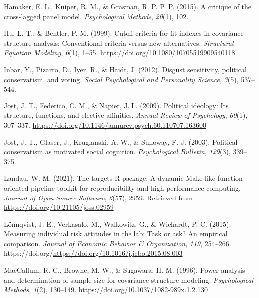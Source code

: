 \documentclass[
  man,floatsintext]{apa6}
\newlength{\cslhangindent}
\newlength{\cslentryspacingunit} %
\newenvironment{CSLReferences}[2] %
 {%
  \setlength{\parindent}{0pt}
  \ifodd #1
  \let\oldpar\par
  \def\par{\hangindent=\cslhangindent\oldpar}
  \fi
  \setlength{\parskip}{#2\cslentryspacingunit}
 }%
 {}
\begin{document}
\begin{CSLReferences}{1}{0}
\leavevmode{}%
Hamaker, E. L., Kuiper, R. M., \& Grasman, R. P. P. P. (2015). A critique of the cross-lagged panel model. \emph{Psychological Methods}, \emph{20}(1), 102.

\leavevmode{}%
Hu, L. T., \& Bentler, P. M. (1999). Cutoff criteria for fit indexes in covariance structure analysis: Conventional criteria versus new alternatives. \emph{Structural Equation Modeling}, \emph{6}(1), 1--55. \url{https://doi.org/10.1080/10705519909540118}

\leavevmode{}%
Inbar, Y., Pizarro, D., Iyer, R., \& Haidt, J. (2012). Disgust sensitivity, political conservatism, and voting. \emph{Social Psychological and Personality Science}, \emph{3}(5), 537--544.

\leavevmode{}%
Jost, J. T., Federico, C. M., \& Napier, J. L. (2009). Political ideology: Its structure, functions, and elective affinities. \emph{Annual Review of Psychology}, \emph{60}(1), 307--337. \url{https://doi.org/10.1146/annurev.psych.60.110707.163600}

\leavevmode{}%
Jost, J. T., Glaser, J., Kruglanski, A. W., \& Sulloway, F. J. (2003). Political conservatism as motivated social cognition. \emph{Psychological Bulletin}, \emph{129}(3), 339--375.

\leavevmode{}%
Landau, W. M. (2021). The targets {R} package: A dynamic {M}ake-like function-oriented pipeline toolkit for reproducibility and high-performance computing. \emph{Journal of Open Source Software}, \emph{6}(57), 2959. Retrieved from \url{https://doi.org/10.21105/joss.02959}

\leavevmode{}%
Lönnqvist, J.-E., Verkasalo, M., Walkowitz, G., \& Wichardt, P. C. (2015). Measuring individual risk attitudes in the lab: Task or ask? An empirical comparison. \emph{Journal of Economic Behavior \& Organization}, \emph{119}, 254--266. https://doi.org/\url{https://doi.org/10.1016/j.jebo.2015.08.003}

\leavevmode{}%
MacCallum, R. C., Browne, M. W., \& Sugawara, H. M. (1996). Power analysis and determination of sample size for covariance structure modeling. \emph{Psychological Methods}, \emph{1}(2), 130--149. \url{https://doi.org/10.1037/1082-989x.1.2.130}


\end{CSLReferences}
\end{document}
